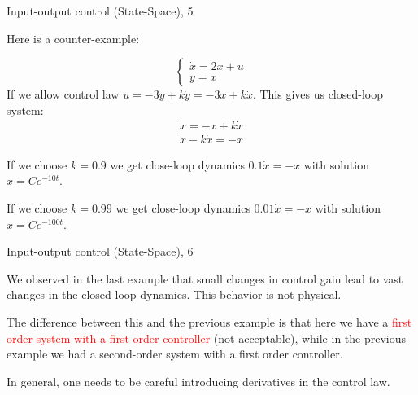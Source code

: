 \documentclass{beamer}
\begin{document}
\begin{frame}{Input-output control (State-Space), 5}
	\begin{flushleft}
		
		Here is a counter-example:
		
		\begin{example}
			
			\begin{equation}
				\begin{cases}
					\dot x = 2x + u \\
					y = x
				\end{cases}
			\end{equation}
			If we allow control law $u = -3 y +k \dot y = -3 x + k \dot x$. This gives us closed-loop system:
			\begin{align}
				\dot x = -x + k \dot x \\
				\dot x-k \dot x = -x
			\end{align}		
			
			If we choose $k = 0.9$ we get close-loop dynamics $0.1\dot x = -x$ with solution $x = C e^{-10t}$.
			
			If we choose $k = 0.99$ we get close-loop dynamics $0.01\dot x = -x$ with solution $x = C e^{-100t}$.
		\end{example}
		
	\end{flushleft}
\end{frame}


\begin{frame}{Input-output control (State-Space), 6}
	\begin{flushleft}
		
		We observed in the last example that small changes in control gain lead to vast changes in the closed-loop dynamics. This behavior is not physical. 
		
		\bigskip
		
		The difference between this and the previous example is that here we have a \textcolor{red}{first order system with a first order controller} (not acceptable), while in the previous example we had a \textcolor{mydarkgreen}{second-order system with a first order controller}. 
		
		\bigskip
		
		In general, one needs to be careful introducing derivatives in the control law.
		
	\end{flushleft}
\end{frame}
\end{document}
